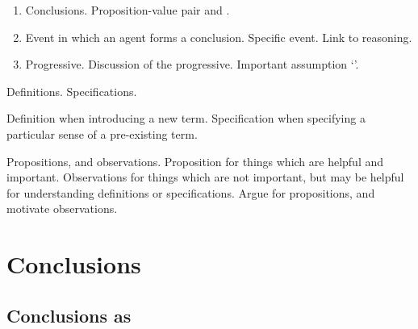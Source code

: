 \begin{note}
  \begin{enumerate}[label=, leftmargin=0pt]
  \item

    Conclusions.
    Proposition-value pair and .
  \item

    Event in which an agent forms a conclusion.
    Specific event.
    Link to reasoning.
  \item

    Progressive.
    Discussion of the progressive.
    Important assumption `\assuPP{}'.
  \end{enumerate}
\end{note}

\begin{note}
  Definitions.
  Specifications.

  Definition when introducing a new term.
  Specification when specifying a particular sense of a pre-existing term.

  Propositions, and observations.
  Proposition for things which are helpful and important.
  Observations for things which are not important, but may be helpful for understanding definitions or specifications.
  Argue for propositions, and motivate observations.
\end{note}

\section{Conclusions}
\label{cha:clar:sec:Cons}

\subsection{Conclusions as }
\label{cha:clar:sec:Cons:pvp}

